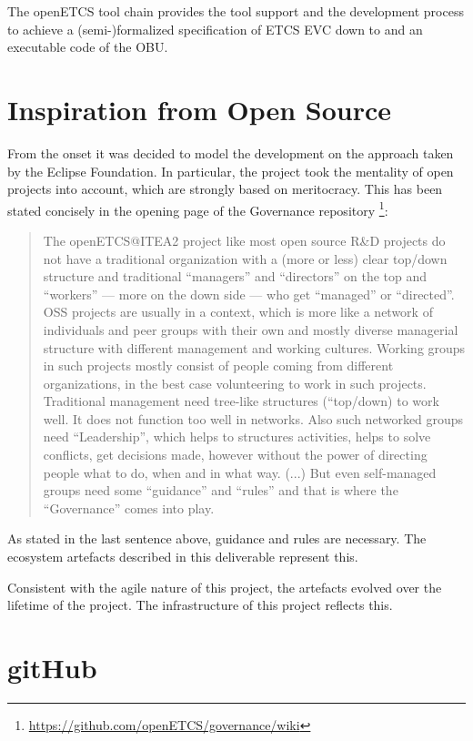 \documentclass{template/openetcs_report}
\begin{document}
The openETCS tool chain provides the tool support and the development process to achieve a (semi-)formalized
specification of ETCS EVC down to and an executable code of the
OBU.

\section{Inspiration from Open Source}

From the onset it was decided to model the development on the approach taken by the
Eclipse Foundation. In particular, the project took the mentality of open projects into account, which are strongly based on meritocracy.  This has been stated concisely in the opening page of the Governance repository \footnote{\url{https://github.com/openETCS/governance/wiki}}:

\begin{quote}
The openETCS@ITEA2 project like most open source R\&D projects do not have a traditional organization with a (more or less) clear top/down structure and traditional ``managers'' and ``directors'' on the top and ``workers'' --- more on the down side --- who get ``managed'' or ``directed''. OSS projects are usually in a context, which is more like a network of individuals and peer groups with their own and mostly diverse managerial structure with different management and working cultures. Working groups in such projects mostly consist of people coming from different organizations, in the best case volunteering to work in such projects. Traditional management need tree-like structures (``top/down) to work well. It does not function too well in networks. Also such networked groups need “Leadership”, which helps to structures activities, helps to solve conflicts, get decisions made, however without the power of directing people what to do, when and in what way. (...) But even self-managed groups need some ``guidance'' and ``rules'' and that is where the ``Governance'' comes into play.
\end{quote}

As stated in the last sentence above, guidance and rules are necessary.  The ecosystem artefacts described in this deliverable represent this.

Consistent with the agile nature of this project, the artefacts evolved over the lifetime of the project. The infrastructure of this project reflects this.

\section{gitHub}
\end{document}
